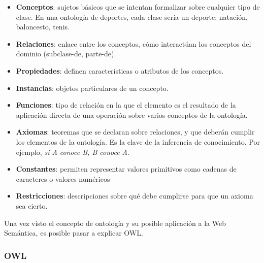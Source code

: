 \begin{itemize}
	\item \textbf{Conceptos}: sujetos básicos que se intentan formalizar sobre cualquier tipo de clase. En una ontología de deportes, cada clase sería un deporte: natación, baloncesto, tenis.
	
	\item  \textbf{Relaciones}: enlace entre los conceptos, cómo interactúan los conceptos del dominio (subclase-de, parte-de).
	
	\item \textbf{Propiedades}: definen características o atributos de los conceptos.
	
	\item \textbf{Instancias}: objetos particulares de un concepto.
		
	\item \textbf{Funciones}: tipo de relación en la que el elemento es el resultado de la aplicación directa de una operación sobre varios conceptos de la ontología.
		
	\item \textbf{Axiomas}: teoremas que se declaran sobre relaciones, y que deberán cumplir los elementos de la ontología. Es la clave de la inferencia de conocimiento. Por ejemplo, \textit{si A conoce B, B conoce A}.
	
	\item \textbf{Constantes}: permiten representar valores primitivos como cadenas de caracteres o valores numéricos
	
	\item \textbf{Restricciones}: descripciones sobre qué debe cumplirse para que un axioma sea cierto.
	
\end{itemize}


Una vez visto el concepto de ontología y su posible aplicación a la Web Semántica, es posible pasar a explicar OWL.

\subsubsection{OWL}

